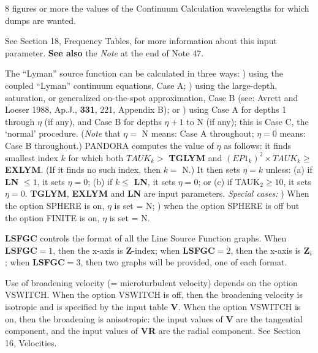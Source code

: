 8 figures or more the values of the Continuum Calculation wavelengths for
which dumps are wanted.
\blankline
\blankline
\centerline{}
\space \noindent
See Section 18, Frequency Tables, for more information about this input parameter.
{\bf See also} the {\it Note} at the end of Note 47.
\blankline
\blankline
\centerline{}
\space \noindent
The ``Lyman'' source function can be calculated in three ways: ) using the coupled ``Lyman'' continuum equations, Case A; ) using the large-depth, saturation, or generalized on-the-spot approximation,
Case B (see: Avrett and Loeser 1988, Ap.J., {\bf 331}, 221, Appendix B); or ) using Case A for depths 1 through $\eta$ (if any), and Case B for depths 
$\eta + 1$ to N (if any); this is Case C, the `normal' procedure. \np
({\it Note} that $\eta =$ N means: Case A throughout;
$\eta = 0$ means: Case B throughout.) \np
PANDORA computes the value of $\eta$ as follows: it finds
smallest index $k$ for which both $TAUK_k > $ {\bf TGLYM} and 
$(EP1_k)^2 \times TAUK_k \ge $ {\bf EXLYM}. (If it finds no such index,
then $k =$ N.) It then sets $\eta = k$
unless: (a) if {\bf LN} $\le 1$, it sets $\eta = 0$; 
(b) if $k \le$ {\bf LN}, it sets $\eta = 0$; or 
(c) if TAUK$_2 \ge 10$, it sets $\eta = 0$. \np
{\bf TGLYM}, {\bf EXLYM} and {\bf LN} are input parameters. \np
{\it Special cases:} ) When the option SPHERE is on, $\eta$ is set = N; ) when the  option SPHERE is off but the option FINITE is on, $\eta$ is set = N. 
\ej
\centerline{}
\space \noindent
{\bf LSFGC} controls the format of all the Line Source Function graphs. \np
When {\bf LSFGC}$ = 1$, then the x-axis is {\bf Z}-index; \np
when {\bf LSFGC}$ = 2$, then the x-axis is {\bf Z}$_i$; \np
when {\bf LSFGC}$ = 3$, then two graphs will be provided, one of each format.
\blankline
\blankline
\centerline{}
\space \noindent
Use of broadening velocity (= microturbulent velocity) depends on the option
VSWITCH. When the option VSWITCH is off, then the broadening velocity is
isotropic and is specified by the input table {\bf V}. 
When the option VSWITCH is on, then the broadening is anisotropic: the input
values of {\bf V} are the tangential component, and the input values of
{\bf VR} are the radial component. See Section 16, Velocities.
\blankline
\blankline
\centerline{}
\space \noindent
